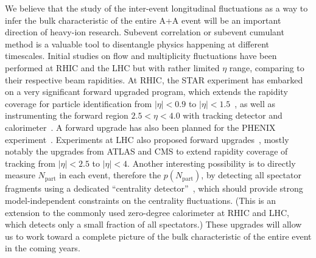 We believe that the study of the inter-event longitudinal fluctuations as a way to infer the bulk characteristic of the entire A+A event will be an important direction of heavy-ion research. Subevent correlation or subevent cumulant method is a valuable tool to disentangle physics happening at different timescales. Initial studies on flow and multiplicity fluctuations have been performed at RHIC and the LHC but with rather limited $\eta$ range, comparing to their respective beam rapidities. At RHIC, the STAR experiment has embarked on a very significant forward upgraded program, which extends the rapidity coverage for particle identification from $|\eta|<0.9$ to $|\eta|<1.5$~\cite{LinkSTAR:2015tdr}, as well as instrumenting the forward region $2.5<\eta<4.0$ with tracking detector and calorimeter~\cite{LinkSTAR:2016fcs}. A forward upgrade has also been planned for the PHENIX experiment~\cite{Adare:2015kwa}. Experiments at LHC also proposed forward upgrades~\cite{LinkLHC:2017whl}, mostly notably the upgrades from ATLAS and CMS to extend rapidity coverage of tracking from $|\eta|<2.5$ to $|\eta|<4$. Another interesting possibility is to directly measure $N_\text{part}$ in each event, therefore the $p(N_\text{part})$, by detecting all spectator fragments using a dedicated ``centrality detector''~\cite{Tarafdar:2014oua}, which should provide strong model-independent constraints on the centrality fluctuations. (This is an extension to the commonly used zero-degree calorimeter at RHIC and LHC, which detects only a small fraction of all spectators.) These upgrades will allow us to work toward a complete picture of the bulk characteristic of the entire event in the coming years.





